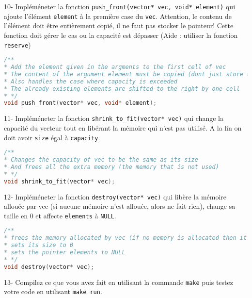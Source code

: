 \documentclass[a4paper]{article}
\begin{document}
	10- Impléméneter la fonction \texttt{push\_front(vector* vec, void* element)} qui ajoute l'élément \texttt{element} à la première case du \texttt{vec}. Attention, le contenu de l'élément doit être entièrement copié, il ne faut pas stocker le pointeur! Cette fonction doit gérer le cas ou la capacité est dépasser (Aide : utiliser la fonction \texttt{reserve})
\begin{lstlisting}[language=C]
/**
* Add the element given in the argments to the first cell of vec
* The content of the argument element must be copied (dont just store the pointer)
* Also handles the case where capacity is exceeded
* The already existing elements are shifted to the right by one cell
* */
void push_front(vector* vec, void* element);
\end{lstlisting}

	11- Impléméneter la fonction \texttt{shrink\_to\_fit(vector* vec)} qui change la capacité du vecteur tout en libérant la mémoire qui n'est pas utilisé. A la fin on doit avoir \texttt{size} égal à \texttt{capacity}.
\begin{lstlisting}[language=C]
/**
* Changes the capacity of vec to be the same as its size
* And frees all the extra memory (the memory that is not used)
* */
void shrink_to_fit(vector* vec);
\end{lstlisting}

	12- Impléméneter la fonction \texttt{destroy(vector* vec)} qui libère la mémoire allouée par vec (si aucune mémoire n'est allouée, alors ne fait rien), change sa taille en 0 et affecte \texttt{elements} à \texttt{NULL}.
\begin{lstlisting}[language=C]
/**
* frees the memory allocated by vec (if no memory is allocated then it does nothing)
* sets its size to 0
* sets the pointer elements to NULL
* */
void destroy(vector* vec);
\end{lstlisting}

	13- Compilez ce que vous avez fait en utilisant la commande \texttt{make} puis testez votre code en utilisant \texttt{make run}.
	
\end{document}
